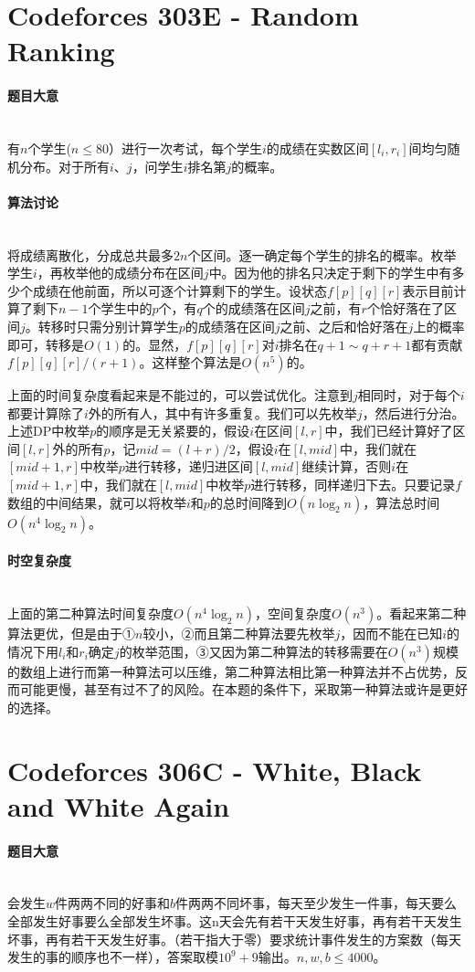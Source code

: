 \documentclass[UTF8]{ctexart}
\newcommand{\myparagraph}[1]{\paragraph{#1}\mbox{}\\}
\theoremstyle{nonumberplain}
\begin{document}
	\section{Codeforces 303E - Random Ranking}
	
		\myparagraph{题目大意}
		
			有$n$个学生($n \leq 80$）进行一次考试，每个学生$i$的成绩在实数区间$[l_i,r_i]$间均匀随机分布。对于所有$i$、$j$，问学生$i$排名第$j$的概率。
		
		\myparagraph{算法讨论}
		
			将成绩离散化，分成总共最多$2n$个区间。逐一确定每个学生的排名的概率。枚举学生$i$，再枚举他的成绩分布在区间$j$中。因为他的排名只决定于剩下的学生中有多少个成绩在他前面，所以可逐个计算剩下的学生。设状态$f[p][q][r]$表示目前计算了剩下$n-1$个学生中的$p$个，有$q$个的成绩落在区间$j$之前，有$r$个恰好落在了区间$j$。转移时只需分别计算学生$p$的成绩落在区间$j$之前、之后和恰好落在$j$上的概率即可，转移是$O(1)$的。显然，$f[p][q][r]$对$i$排名在$q+1 \sim q+r+1$都有贡献$f[p][q][r]/(r+1)$。这样整个算法是$O(n^5)$的。
			
			上面的时间复杂度看起来是不能过的，可以尝试优化。注意到$j$相同时，对于每个$i$都要计算除了$i$外的所有人，其中有许多重复。我们可以先枚举$j$，然后进行分治。上述DP中枚举$p$的顺序是无关紧要的，假设$i$在区间$[l,r]$中，我们已经计算好了区间$[l,r]$外的所有$p$，记$mid=(l+r)/2$，假设$i$在$[l,mid]$中，我们就在$[mid+1,r]$中枚举$p$进行转移，递归进区间$[l,mid]$继续计算，否则$i$在$[mid+1,r]$中，我们就在$[l,mid]$中枚举$p$进行转移，同样递归下去。只要记录$f$数组的中间结果，就可以将枚举$i$和$p$的总时间降到$O(n\log_2n)$，算法总时间$O(n^4\log_2n)$。
		
		\myparagraph{时空复杂度}
		
			上面的第二种算法时间复杂度$O(n^4\log_2n)$，空间复杂度$O(n^3)$。看起来第二种算法更优，但是由于①$n$较小，②而且第二种算法要先枚举$j$，因而不能在已知$i$的情况下用$l_i$和$r_i$确定$j$的枚举范围，③又因为第二种算法的转移需要在$O(n^3)$规模的数组上进行而第一种算法可以压维，第二种算法相比第一种算法并不占优势，反而可能更慢，甚至有过不了的风险。在本题的条件下，采取第一种算法或许是更好的选择。
	
	\section{Codeforces 306C - White, Black and White Again}
	
		\myparagraph{题目大意}
			
			会发生$w$件两两不同的好事和$b$件两两不同坏事，每天至少发生一件事，每天要么全部发生好事要么全部发生坏事。这n天会先有若干天发生好事，再有若干天发生坏事，再有若干天发生好事。（若干指大于零）要求统计事件发生的方案数（每天发生的事的顺序也不一样），答案取模$10^9+9$输出。$n,w,b \leq 4000$。
			
\end{document}
